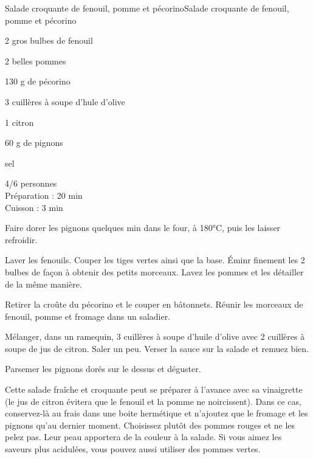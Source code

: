 \begin{recette}{Salade croquante de fenouil, pomme et pécorino}{Salade croquante de fenouil, pomme et pécorino}

\begin{ingredients}
2 gros bulbes de fenouil\par
2 belles pommes\par
130 g de pécorino\par
3 cuillères à soupe d'hule d'olive\par
1 citron\par
60 g de pignons\par
sel\par
\end{ingredients}

\begin{infos}
4/6 personnes\\
Préparation : 20 min\\
Cuisson : 3 min\\
\end{infos}

\begin{etapes}
\item Faire dorer les pignons quelques min dans le four, à 180°C, puis les laisser refroidir.
\item Laver les fenouils. Couper les tiges vertes ainsi que la base. Éminr finement les 2 bulbes de façon à obtenir des petits morceaux. Lavez les pommes et les détailler de la même manière.
\item Retirer la croûte du pécorino et le couper en bâtonnets. Réunir les morceaux de fenouil, pomme et fromage dans un saladier.
\item Mélanger, dans un ramequin, 3 cuillères à soupe d'huile d'olive avec 2 cuillères à soupe de jus de citron. Saler un peu. Verser la sauce sur la salade et remuez bien.
\item Parsemer les pignons dorés sur le dessus et déguster.
\end{etapes}

\begin{conseils}
Cette salade fraîche et croquante peut se préparer à l'avance avec sa vinaigrette (le jus de citron évitera que le fenouil et la pomme ne noircissent). Dans ce cas, conservez-là au frais dans une boite hermétique et n'ajoutez que le fromage et les pignons qu'au dernier moment.
Choisissez plutôt des pommes rouges et ne les pelez pas. Leur peau apportera de la couleur à la salade. Si vous aimez les saveurs plus acidulées, vous pouvez aussi utiliser des pommes vertes.
\end{conseils}

\end{recette}